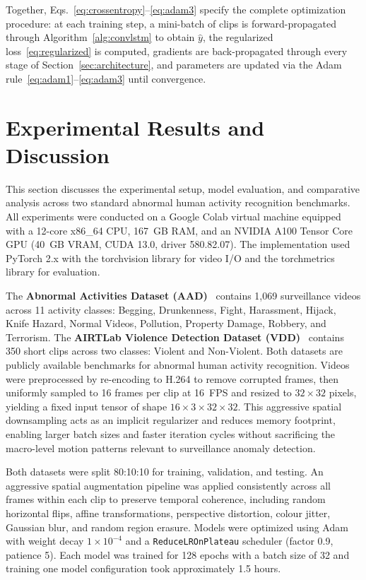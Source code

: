 \documentclass[11pt,a4paper]{article}
\begin{document}
    Together, Eqs.~\eqref{eq:crossentropy}--\eqref{eq:adam3} specify the complete optimization procedure: at each training step, a mini-batch of clips is forward-propagated through Algorithm~\ref{alg:convlstm} to obtain $\hat{y}$, the regularized loss~\eqref{eq:regularized} is computed, gradients are back-propagated through every stage of Section~\ref{sec:architecture}, and parameters are updated via the Adam rule~\eqref{eq:adam1}--\eqref{eq:adam3} until convergence.


	\section{Experimental Results and Discussion}

	This section discusses the experimental setup, model evaluation, and comparative analysis across two standard abnormal human activity recognition benchmarks. All experiments were conducted on a Google Colab virtual machine equipped with a 12-core x86\_64 CPU, 167~GB RAM, and an NVIDIA A100 Tensor Core GPU (40~GB VRAM, CUDA 13.0, driver 580.82.07). The implementation used PyTorch 2.x with the torchvision library for video I/O and the torchmetrics library for evaluation.

	The \textbf{Abnormal Activities Dataset (AAD)}~\cite{vrskova2022} contains 1,069 surveillance videos across 11 activity classes: Begging, Drunkenness, Fight, Harassment, Hijack, Knife Hazard, Normal Videos, Pollution, Property Damage, Robbery, and Terrorism. The \textbf{AIRTLab Violence Detection Dataset (VDD)}~\cite{sernani2021} contains 350 short clips across two classes: Violent and Non-Violent. Both datasets are publicly available benchmarks for abnormal human activity recognition. Videos were preprocessed by re-encoding to H.264 to remove corrupted frames, then uniformly sampled to 16 frames per clip at 16~FPS and resized to $32 \times 32$ pixels, yielding a fixed input tensor of shape $16 \times 3 \times 32 \times 32$. This aggressive spatial downsampling acts as an implicit regularizer and reduces memory footprint, enabling larger batch sizes and faster iteration cycles without sacrificing the macro-level motion patterns relevant to surveillance anomaly detection.

	Both datasets were split 80:10:10 for training, validation, and testing. An aggressive spatial augmentation pipeline was applied consistently across all frames within each clip to preserve temporal coherence, including random horizontal flips, affine transformations, perspective distortion, colour jitter, Gaussian blur, and random region erasure. Models were optimized using Adam with weight decay $1 \times 10^{-4}$ and a \texttt{ReduceLROnPlateau} scheduler (factor 0.9, patience 5). Each model was trained for 128 epochs with a batch size of 32 and training one model configuration took approximately 1.5 hours.
\end{document}
